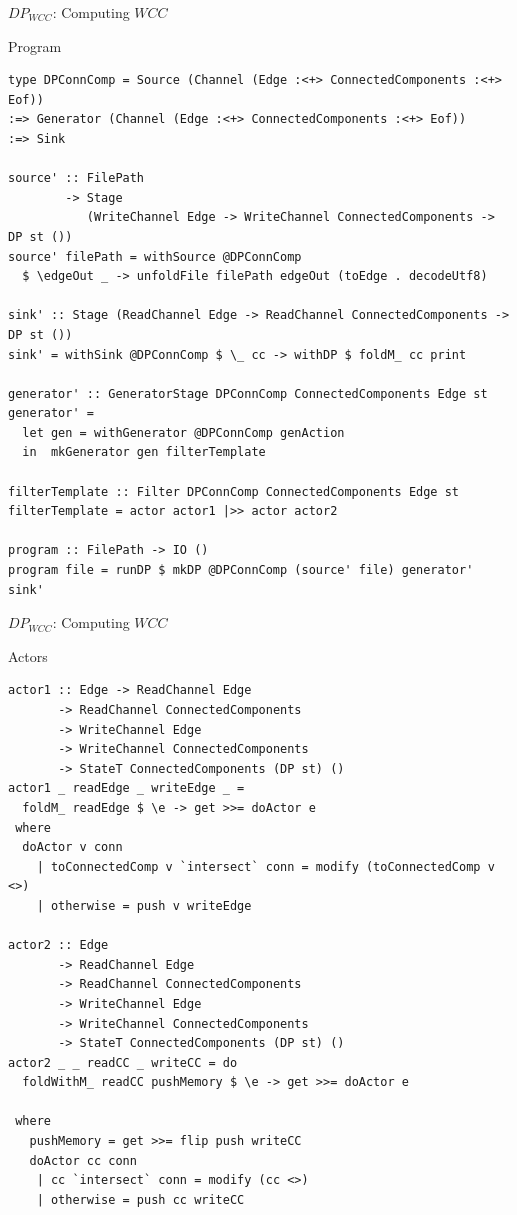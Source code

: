 \documentclass{beamer}
\begin{document}
  \begin{frame}[fragile]{$DP_{WCC}$: Computing $WCC$}
    \begin{block}{Program}
      \begin{verbatim}      
type DPConnComp = Source (Channel (Edge :<+> ConnectedComponents :<+> Eof))
:=> Generator (Channel (Edge :<+> ConnectedComponents :<+> Eof))
:=> Sink

source' :: FilePath
        -> Stage
           (WriteChannel Edge -> WriteChannel ConnectedComponents -> DP st ())
source' filePath = withSource @DPConnComp
  $ \edgeOut _ -> unfoldFile filePath edgeOut (toEdge . decodeUtf8)

sink' :: Stage (ReadChannel Edge -> ReadChannel ConnectedComponents -> DP st ())
sink' = withSink @DPConnComp $ \_ cc -> withDP $ foldM_ cc print

generator' :: GeneratorStage DPConnComp ConnectedComponents Edge st
generator' =
  let gen = withGenerator @DPConnComp genAction
  in  mkGenerator gen filterTemplate

filterTemplate :: Filter DPConnComp ConnectedComponents Edge st
filterTemplate = actor actor1 |>> actor actor2

program :: FilePath -> IO ()
program file = runDP $ mkDP @DPConnComp (source' file) generator' sink'
      \end{verbatim}
    \end{block}
  \end{frame}

  \begin{frame}[fragile]{$DP_{WCC}$: Computing $WCC$}
    \begin{block}{Actors}
      \begin{verbatim}      
actor1 :: Edge -> ReadChannel Edge
       -> ReadChannel ConnectedComponents
       -> WriteChannel Edge
       -> WriteChannel ConnectedComponents
       -> StateT ConnectedComponents (DP st) ()
actor1 _ readEdge _ writeEdge _ = 
  foldM_ readEdge $ \e -> get >>= doActor e
 where
  doActor v conn
    | toConnectedComp v `intersect` conn = modify (toConnectedComp v <>)
    | otherwise = push v writeEdge

actor2 :: Edge
       -> ReadChannel Edge
       -> ReadChannel ConnectedComponents
       -> WriteChannel Edge
       -> WriteChannel ConnectedComponents
       -> StateT ConnectedComponents (DP st) ()
actor2 _ _ readCC _ writeCC = do 
  foldWithM_ readCC pushMemory $ \e -> get >>= doActor e

 where
   pushMemory = get >>= flip push writeCC
   doActor cc conn
    | cc `intersect` conn = modify (cc <>)
    | otherwise = push cc writeCC
      \end{verbatim}
    \end{block}
  \end{frame}
\end{document}
